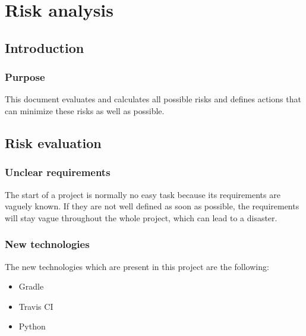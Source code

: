 
\chapter{Risk analysis} %

\label{ChapterX} %



\section{Introduction}

\subsection{Purpose}

This document evaluates and calculates all possible risks and defines actions that can minimize these risks as well as possible.

\section{Risk evaluation}

\subsection{Unclear requirements}

The start of a project is normally no easy task because its requirements are vaguely known. If they are not well defined as soon as possible, the requirements will stay vague throughout the whole project, which can lead to a disaster. 

\subsection{New technologies}

The new technologies which are present in this project are the following:

 \begin{itemize}
    \item Gradle
    \item Travis CI
    \item Python
\end{itemize}

